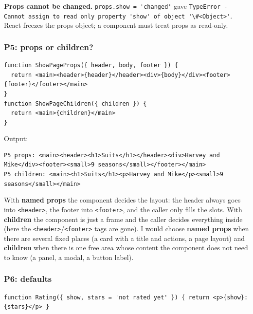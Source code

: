 \documentclass[
  10pt,
]{article}
\newcommand{\passthrough}[1]{#1}
\begin{document}
\textbf{Props cannot be changed.}
\passthrough{\lstinline!props.show = 'changed'!} gave
\passthrough{\lstinline!TypeError - Cannot assign to read only property 'show' of object '\#<Object>'!}.
React freezes the props object; a component must treat props as
read-only.

\hypertarget{p5-props-or-children}{%
\subsubsection{P5: props or children?}\label{p5-props-or-children}}

\begin{lstlisting}
function ShowPageProps({ header, body, footer }) {
  return <main><header>{header}</header><div>{body}</div><footer>{footer}</footer></main>
}
function ShowPageChildren({ children }) {
  return <main>{children}</main>
}
\end{lstlisting}

Output:

\begin{lstlisting}
P5 props: <main><header><h1>Suits</h1></header><div>Harvey and Mike</div><footer><small>9 seasons</small></footer></main>
P5 children: <main><h1>Suits</h1><p>Harvey and Mike</p><small>9 seasons</small></main>
\end{lstlisting}

With \textbf{named props} the component decides the layout: the header
always goes into \passthrough{\lstinline!<header>!}, the footer into
\passthrough{\lstinline!<footer>!}, and the caller only fills the slots.
With \textbf{children} the component is just a frame and the caller
decides everything inside (here the
\passthrough{\lstinline!<header>!}/\passthrough{\lstinline!<footer>!}
tags are gone). I would choose \textbf{named props} when there are
several fixed places (a card with a title and actions, a page layout)
and \textbf{children} when there is one free area whose content the
component does not need to know (a panel, a modal, a button label).

\hypertarget{p6-defaults}{%
\subsubsection{P6: defaults}\label{p6-defaults}}

\begin{lstlisting}
function Rating({ show, stars = 'not rated yet' }) { return <p>{show}: {stars}</p> }
\end{lstlisting}
\end{document}
